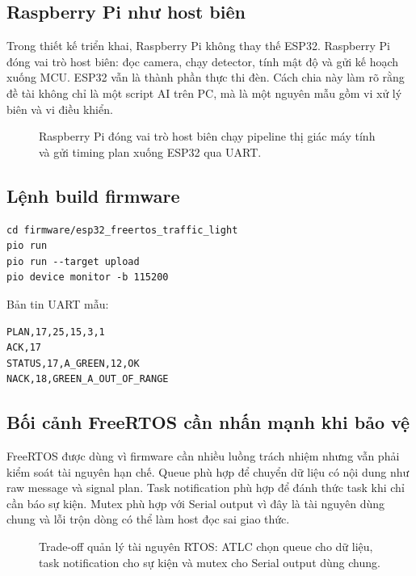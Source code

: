 \subsection{Raspberry Pi như host biên}

Trong thiết kế triển khai, Raspberry Pi không thay thế ESP32. Raspberry Pi đóng vai trò host biên: đọc camera, chạy detector, tính mật độ và gửi kế hoạch xuống MCU. ESP32 vẫn là thành phần thực thi đèn. Cách chia này làm rõ rằng đề tài không chỉ là một script AI trên PC, mà là một nguyên mẫu gồm vi xử lý biên và vi điều khiển.

\begin{figure}[H]
  \centering
  \caption{Raspberry Pi đóng vai trò host biên chạy pipeline thị giác máy tính và gửi timing plan xuống ESP32 qua UART.}
  \label{fig:appendix-raspi-host}
\end{figure}

\subsection{Lệnh build firmware}

\begin{lstlisting}
cd firmware/esp32_freertos_traffic_light
pio run
pio run --target upload
pio device monitor -b 115200
\end{lstlisting}

Bản tin UART mẫu:

\begin{lstlisting}
PLAN,17,25,15,3,1
ACK,17
STATUS,17,A_GREEN,12,OK
NACK,18,GREEN_A_OUT_OF_RANGE
\end{lstlisting}

\subsection{Bối cảnh FreeRTOS cần nhấn mạnh khi bảo vệ}

FreeRTOS được dùng vì firmware cần nhiều luồng trách nhiệm nhưng vẫn phải kiểm soát tài nguyên hạn chế. Queue phù hợp để chuyển dữ liệu có nội dung như raw message và signal plan. Task notification phù hợp để đánh thức task khi chỉ cần báo sự kiện. Mutex phù hợp với Serial output vì đây là tài nguyên dùng chung và lỗi trộn dòng có thể làm host đọc sai giao thức.

\begin{figure}[H]
  \centering
  \caption{Trade-off quản lý tài nguyên RTOS: ATLC chọn queue cho dữ liệu, task notification cho sự kiện và mutex cho Serial output dùng chung.}
  \label{fig:appendix-resource-tradeoff}
\end{figure}

